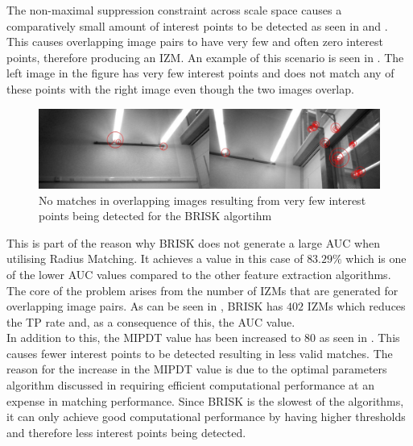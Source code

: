 
The non-maximal suppression constraint across scale space causes a comparatively small amount of interest points to be detected as seen in  and . This causes overlapping image pairs to have very few and often zero interest points, therefore producing an IZM. An example of this scenario is seen in . The left image in the figure has very few interest points and does not match any of these points with the right image even though the two images overlap.\\

\begin{figure}
  \centering
    \includegraphics[width=1.0\textwidth]{../Drawings/Matching/noMatchesBrisk4.jpg}
    \caption{No matches in overlapping images resulting from very few interest points being detected for the BRISK algortihm }
    \label{fig:noMatchesBrisk4}
\end{figure}

This is part of the reason why BRISK does not generate a large AUC when utilising Radius Matching. It achieves a  value in this case of $83.29\%$ which is one of the lower AUC values compared to the other feature extraction algorithms. The core of the problem arises from the number of IZMs that are generated for overlapping image pairs. As can be seen in , BRISK has $402$ IZMs which reduces the TP rate and, as a consequence of this, the AUC value.\\

In addition to this, the MIPDT value has been increased to $80$ as seen in . This causes fewer interest points to be detected resulting in less valid matches. The reason for the increase in the MIPDT value is due to the optimal parameters algorithm discussed in  requiring efficient computational performance at an expense in matching performance. Since BRISK is the slowest of the algorithms, it can only achieve good computational performance by having higher thresholds and therefore less interest points being detected.\\

